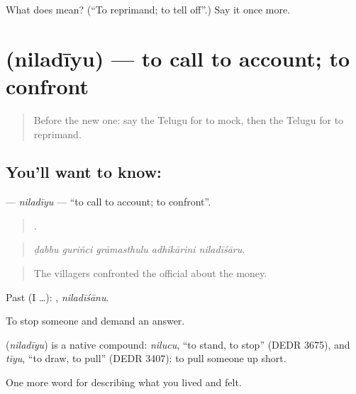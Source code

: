 \begin{tcolorbox}[breakable,colback=teal!4,colframe=teal!35!black,title={Before you move on}]
What does  mean? (\textquotedblleft{}To reprimand; to tell off\textquotedblright{}.) Say it once more.
\end{tcolorbox}
\section[\texorpdfstring{\te{నిలదీయు} (niladīyu)}{నిలదీయు (niladīyu)}]{ (niladīyu) — to call to account; to confront}

\label{lesson:TE-C535-niladiyu}



\begin{quote}
Before the new one: say the Telugu for to mock, then the Telugu for to reprimand.
\end{quote}

\subsection*{You'll want to know: }
\textbf{} — \emph{niladīyu} — \textquotedblleft{}to call to account; to confront\textquotedblright{}.

\begin{quote}
    .
\end{quote}

\begin{quote}
\emph{ḍabbu guriñci grāmasthulu adhikārini niladīśāru.}
\end{quote}

\begin{quote}
The villagers confronted the official about the money.
\end{quote}

Past (I …): , \emph{niladīśānu}.

To stop someone and demand an answer.

\begin{cousinweb}
\textbf{} (\emph{niladīyu}) is a native compound: \emph{nilucu}, \textquotedblleft{}to stand, to stop\textquotedblright{} (DEDR 3675), and \emph{tīyu}, \textquotedblleft{}to draw, to pull\textquotedblright{} (DEDR 3407): to pull someone up short.
\end{cousinweb}

\begin{grammarlens}[title={What you've built}]
One more word for describing what you lived and felt.
\end{grammarlens}

